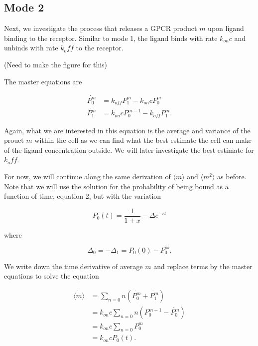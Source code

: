 \subsection{\label{sec:mode2}Mode 2}

Next, we investigate the process that releases a GPCR product $m$ upon ligand binding to the receptor. Similar to mode 1, the ligand binds with rate $k_{on}c$ and unbinds with rate $k_off$ to the receptor.

(Need to make the figure for this)

The master equations are

\begin{equation}
\begin{aligned}
 \dot{P_0^m} &= k_{off}P_1^m - k_{on}cP_0^m \\
 \dot{P_1^m} &= k_{on}cP_0^{m-1} - k_{off}P_1^m.
\end{aligned}
\end{equation}

Again, what we are interested in this equation is the average and variance of the prouct $m$ within the cell as we can find what the best estimate the cell can make of the ligand concentration outside. We will later investigate the best estimate for $k_off$.

For now, we will continue along the same derivation of $\langle m \rangle$ and $\langle m^2 \rangle$ as before. Note that we will use the solution for the probability of being bound as a function of time, equation 2, but with the variation

\begin{equation}
P_0(t) = \frac{1}{1+x} - \Delta e^{-rt}
\end{equation}

where

\begin{equation*}
\Delta_0 = - \Delta_1 = P_0(0) - P_0^{ss}.
\end{equation*}

We write down the time derivative of average $m$ and replace terms by the master equations to solve the equation

\begin{equation*}
\begin{aligned}
\dot{ \langle m \rangle } & = \sum_{n=0} n (\dot{P_0^m} + \dot{P_1^m})\\
                          & = k_{on}c \sum_{n=0} n (P_0^{m-1} - \dot{P_0^m})\\
                          & = k_{on}c \sum_{n=0} P_0^{m}\\
                          & = k_{on}c P_0(t).
\end{aligned}
\end{equation*}

